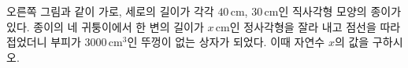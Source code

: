 \noindent\begin{minipage}[t]{0.58\linewidth}\vspace{0pt}\raggedright 오른쪽 그림과 같이 가로, 세로의 길이가 각각 $40\,\mathrm{cm}$, $30\,\mathrm{cm}$인 직사각형 모양의 종이가 있다. 종이의 네 귀퉁이에서 한 변의 길이가 $x\,\mathrm{cm}$인 정사각형을 잘라 내고 점선을 따라 접었더니 부피가 $3000\,\mathrm{cm}^3$인 뚜껑이 없는 상자가 되었다. 이때 자연수 $x$의 값을 구하시오.\end{minipage}\hfill\begin{minipage}[t]{0.4\linewidth}\vspace{0pt}\centering \resizebox{\ifdim\width>\linewidth\linewidth\else\width\fi}{!}{}\end{minipage}\par
